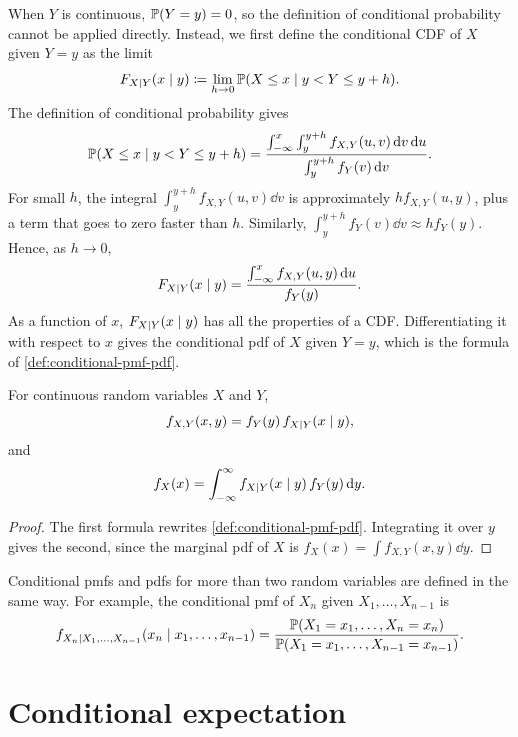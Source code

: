 When $Y$ is continuous, $\mathbb{P}(Y = y) = 0$, so the definition of conditional probability cannot be applied directly. Instead, we first define the conditional CDF of $X$ given $Y = y$ as the limit
\[
  F_{X \mid Y}(x \mid y) \coloneqq \lim_{h \to 0} \mathbb{P}(X \le x \mid y < Y \le y + h).
\]
The definition of conditional probability gives
\[
  \mathbb{P}(X \le x \mid y < Y \le y + h) = \frac{\int_{-\infty}^x \int_y^{y+h} f_{X,Y}(u, v) \mathop{}\!\mathrm{d} v \mathop{}\!\mathrm{d} u}{\int_y^{y+h} f_Y(v) \mathop{}\!\mathrm{d} v}.
\]
For small $h$, the integral $\int_y^{y+h} f_{X,Y}(u, v) \dd v$ is approximately $h f_{X,Y}(u, y)$, plus a term that goes to zero faster than $h$. Similarly, $\int_y^{y+h} f_Y(v) \dd v \approx h f_Y(y)$. Hence, as $h \to 0$,
\[
  F_{X \mid Y}(x \mid y) = \frac{\int_{-\infty}^x f_{X,Y}(u, y) \mathop{}\!\mathrm{d} u}{f_Y(y)}.
\]
As a function of $x$, $F_{X \mid Y}(x \mid y)$ has all the properties of a CDF. Differentiating it with respect to $x$ gives the conditional pdf of $X$ given $Y = y$, which is the formula of \cref{def:conditional-pmf-pdf}.

\begin{theorem}\label{thm:density-product-rule}
For continuous random variables $X$ and $Y$,
\[
  f_{X,Y}(x, y) = f_Y(y)\, f_{X \mid Y}(x \mid y),
\]
and
\begin{equation}\label{eq:total-probability-densities}
  f_X(x) = \int_{-\infty}^\infty f_{X \mid Y}(x \mid y)\, f_Y(y) \mathop{}\!\mathrm{d} y.
\end{equation}
\end{theorem}

\begin{proof}
The first formula rewrites \cref{def:conditional-pmf-pdf}. Integrating it over $y$ gives the second, since the marginal pdf of $X$ is $f_X(x) = \int f_{X,Y}(x, y) \dd y$.
\end{proof}

Conditional pmfs and pdfs for more than two random variables are defined in the same way. For example, the conditional pmf of $X_n$ given $X_1, \ldots, X_{n-1}$ is
\[
  f_{X_n \mid X_1, \ldots, X_{n-1}}(x_n \mid x_1, \ldots, x_{n-1}) = \frac{\mathbb{P}(X_1 = x_1, \ldots, X_n = x_n)}{\mathbb{P}(X_1 = x_1, \ldots, X_{n-1} = x_{n-1})}.
\]

\section{Conditional expectation}\label{sec:conditional-expectation}

